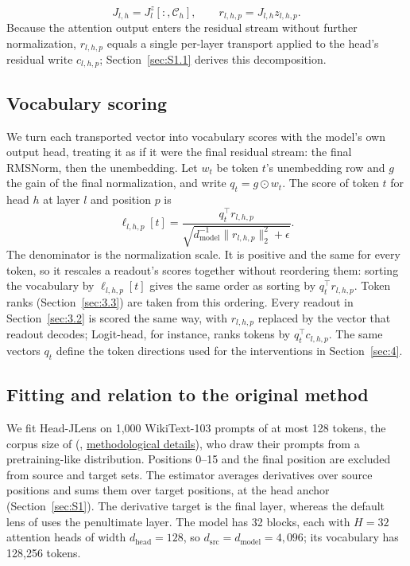 \documentclass[11pt,a4paper]{article}
\begin{document}
\[
J_{l,h}=J_l^z[:,\mathcal C_h],\qquad
r_{l,h,p}=J_{l,h}z_{l,h,p}.
\]
Because the attention output enters the residual stream without further normalization, $r_{l,h,p}$ equals a single per-layer transport applied to the head's residual write $c_{l,h,p}$; Section~\ref{sec:S1.1} derives this decomposition.

\subsection{Vocabulary scoring}\label{sec:2.3}

We turn each transported vector into vocabulary scores with the model's own output head, treating it as if it were the final residual stream: the final RMSNorm, then the unembedding. Let $w_t$ be token $t$'s unembedding row and $g$ the gain of the final normalization, and write $q_t=g\odot w_t$. The score of token $t$ for head $h$ at layer $l$ and position $p$ is
\[
\ell_{l,h,p}[t]=\frac{q_t^\top r_{l,h,p}}{\sqrt{d_{\mathrm{model}}^{-1}\|r_{l,h,p}\|_2^2+\epsilon}}.
\]
The denominator is the normalization scale. It is positive and the same for every token, so it rescales a readout's scores together without reordering them: sorting the vocabulary by $\ell_{l,h,p}[t]$ gives the same order as sorting by $q_t^\top r_{l,h,p}$. Token ranks (Section~\ref{sec:3.3}) are taken from this ordering. Every readout in Section~\ref{sec:3.2} is scored the same way, with $r_{l,h,p}$ replaced by the vector that readout decodes; Logit-head, for instance, ranks tokens by $q_t^\top c_{l,h,p}$. The same vectors $q_t$ define the token directions used for the interventions in Section~\ref{sec:4}.

\subsection{Fitting and relation to the original method}\label{sec:2.4}

We fit Head-JLens on 1,000 WikiText-103 \citep{merity2017} prompts of at most 128 tokens, the corpus size of \citeauthor{gurnee2026} (\citeyear{gurnee2026}, \href{https://transformer-circuits.pub/2026/workspace/\#app-method-details}{methodological details}), who draw their prompts from a pretraining-like distribution. Positions 0--15 and the final position are excluded from source and target sets. The estimator averages derivatives over source positions and sums them over target positions, at the head anchor (Section~\ref{sec:S1}). The derivative target is the final layer, whereas the default lens of \citeauthor{gurnee2026} uses the penultimate layer. The model has 32 blocks, each with $H=32$ attention heads of width $d_{\mathrm{head}}=128$, so $d_{\mathrm{src}}=d_{\mathrm{model}}=4{,}096$; its vocabulary has 128,256 tokens.
\end{document}
